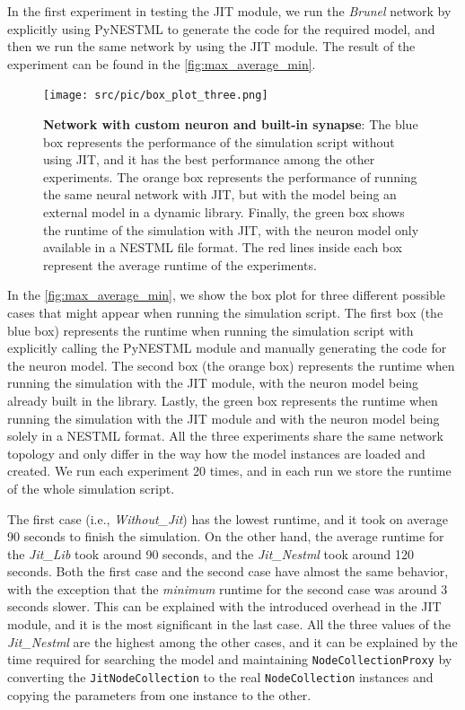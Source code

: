 In the first experiment in testing the JIT module, we run the \emph{Brunel} network by explicitly using PyNESTML to generate the code for the required model, and then we run the same network by using the JIT module. The result of the experiment can be found in the \autoref{fig:max_average_min}.

\begin{figure}[ht!]
    \centering
    \texttt{[image: src/pic/box\_plot\_three.png]}
    \caption{\textbf{Network with custom neuron and built-in synapse}: The blue box represents the performance of the simulation script without using JIT, and it has the best performance among the other experiments. The orange box represents the performance of running the same neural network with JIT, but with the model being an external model in a dynamic library. Finally, the green box shows the runtime of the simulation with JIT, with the neuron model only available in a NESTML file format. The red lines inside each box represent the average runtime of the experiments.}
    \label{fig:max_average_min}
\end{figure}

In the \autoref{fig:max_average_min}, we show the box plot for three different possible cases that might appear when running the simulation script. The first box (the blue box) represents the runtime when running the simulation script with explicitly calling the PyNESTML module and manually generating the code for the neuron model. The second box (the orange box) represents the runtime when running the simulation with the JIT module, with the neuron model being already built in the library. Lastly, the green box represents the runtime when running the simulation with the JIT module and with the neuron model being solely in a NESTML format. All the three experiments share the same network topology and only differ in the way how the model instances are loaded and created. We run each experiment 20 times, and in each run we store the runtime of the whole simulation script.

The first case (i.e., \emph{Without\_Jit}) has the lowest runtime, and it took on average 90 seconds to finish the simulation. On the other hand, the average runtime for the \emph{Jit\_Lib} took around 90 seconds, and the \emph{Jit\_Nestml} took around 120 seconds.  Both the first case and the second case have almost the same behavior, with the exception that the \emph{minimum} runtime for the second case was around 3 seconds slower. This can be explained with the introduced overhead in the JIT module, and it is the most significant in the last case. All the three values of the \emph{Jit\_Nestml} are the highest among the other cases, and it can be explained by the time required for searching the model and maintaining \texttt{NodeCollectionProxy} by converting the \texttt{JitNodeCollection} to the real \texttt{NodeCollection} instances and copying the parameters from one instance to the other.


